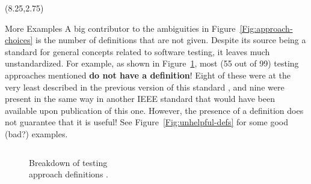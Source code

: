 \documentclass[22pt]{beamer}
\begin{document}
\begin{frame}[fragile]
    \begin{textblock}{7.25}(8.25,2.75)
        \begin{block}{\fontsize{37}{20}\selectfont More Examples}
            A big contributor to the ambiguities in
            Figure~\ref{Fig:approach-choices} is the number of definitions that
            are not given. Despite its source \cite{IEEE2022} being a standard
            for general concepts related to software testing, it leaves much
            unstandardized. For example, as shown in Figure~\ref{Fig:IEEEdefs},
            most (55 out of 99) testing approaches mentioned \textbf{do not
                have a definition}! Eight of these were at the very least
            described in the previous version of this standard \cite{IEEE2013},
            and nine were present in the same way in another
            IEEE standard \cite{IEEE2017} that would have been available
            upon publication of this one. However, the presence of a
            definition does not guarantee that it is useful! See
            Figure~\ref{Fig:unhelpful-defs} for some good (bad?) examples.
            \begin{columns}
                \begin{column}{0.45\textwidth}
                    \begin{center}
                        \begin{figure}
                            \caption{Breakdown of testing\\approach definitions
                                \cite{IEEE2022}.}
                            \label{Fig:IEEEdefs}
                        \end{figure}
                    \end{center}
                \end{column}
                \begin{column}{0.425\textwidth}
                    \begin{center}

\end{center}
\end{column}
\end{columns}
\end{block}
\end{textblock}
\end{frame}
\end{document}
